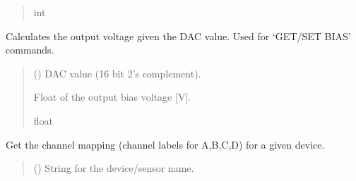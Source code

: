 \documentclass[letterpaper,10pt,english]{sphinxmanual}
\begin{document}
\begin{fulllineitems}
\begin{fulllineitems}
\begin{quote}
\begin{description}
\sphinxAtStartPar
int

\end{description}\end{quote}

\end{fulllineitems}


\begin{fulllineitems}
\label{\detokenize{PodDevice_8401HR:PodDevice_8401HR.POD_8401HR.CalculateBiasDAC_GetVout}}
\pysigstartsignatures
{}
\pysigstopsignatures
\sphinxAtStartPar
Calculates the output voltage given the DAC value. Used for ‘GET/SET BIAS’ commands.
\begin{quote}\begin{description}
\sphinxAtStartPar
{} () \textendash{} DAC value (16 bit 2’s complement).

\sphinxAtStartPar
Float of the output bias voltage {[}V{]}.

\sphinxAtStartPar
float

\end{description}\end{quote}

\end{fulllineitems}


\begin{fulllineitems}
\label{\detokenize{PodDevice_8401HR:PodDevice_8401HR.POD_8401HR.GetChannelMapForPreampDevice}}
\pysigstartsignatures
{}
\pysigstopsignatures
\sphinxAtStartPar
Get the channel mapping (channel labels for A,B,C,D) for a given device.
\begin{quote}\begin{description}
\sphinxAtStartPar
{} () \textendash{} String for the device/sensor name.


\end{description}
\end{quote}
\end{fulllineitems}
\end{fulllineitems}
\end{document}
